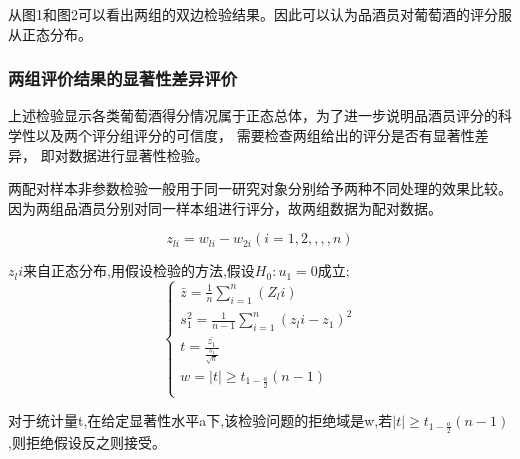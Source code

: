 \documentclass[UTF8]{ctexart}
\begin{document}

从图1\label{figure 1}和图2\label{figure 2}可以看出两组的双边检验结果。因此可以认为品酒员对葡萄酒的评分服从正态分布。

\subsubsection{两组评价结果的显著性差异评价}
上述检验显示各类葡萄酒得分情况属于正态总体，为了进一步说明品酒员评分的科学性以及两个评分组评分的可信度， 需要检查两组给出的评分是否有显著性差异， 即对数据进行显著性检验。

两配对样本非参数检验一般用于同一研究对象分别给予两种不同处理的效果比较。因为两组品酒员分别对同一样本组进行评分，故两组数据为配对数据。

\begin{equation}
	z_{li} = w_{li}-w_{2i}(i=1,2,,,,n)
\end{equation}

$z_li$来自正态分布,用假设检验的方法,假设$H_{0}:u_1=0$成立;
\[\left\{\begin{array}{llcl}

		\bar{z}=\frac{1}{n}\sum_{i=1}^n(Z_li)         \\

		s_{1}^2=\frac{1}{n-1}\sum_{i=1}^n(z_li-z_1)^2 \\

		t=\frac{\bar{z_1}}{\frac{s_1}{\sqrt{n}}}      \\

		w={\mid t \mid \ge t_{1-\frac{a}{2}}(n-1)}    \\

	\end{array} \right.\]

对于统计量t,在给定显著性水平a下,该检验问题的拒绝域是w,若${\mid t \mid \ge t_{1-\frac{a}{2}}(n-1)}$,则拒绝假设反之则接受。
\end{document}
